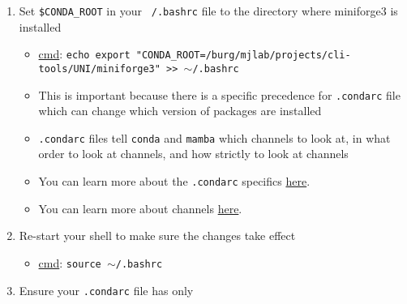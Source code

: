 \documentclass{article}
\newcommand{\UNI}{UNI}
\begin{document}
\begin{enumerate}
        \item Set \texttt{\$CONDA\_ROOT} in your \texttt{~/.bashrc} file to the directory where miniforge3 is installed
        \begin{itemize}
            \item \underline{cmd}: \texttt{echo export "CONDA\_ROOT=/burg/mjlab/projects/cli-tools/\UNI/miniforge3" >> $\sim$/.bashrc}
            \item This is important because there is a specific precedence for \texttt{.condarc} file which can change which version of packages are installed
            \item \texttt{.condarc} files tell \texttt{conda} and \texttt{mamba} which channels to look at, in what order to look at channels, and how strictly to look at channels
            \item You can learn more about the \texttt{.condarc} specifics \href{https://conda.io/projects/conda/en/latest/user-guide/configuration/use-condarc.html}{here}.
            \item You can learn more about channels \href{https://conda.io/projects/conda/en/latest/user-guide/concepts/channels.html}{here}.
        \end{itemize}

        \item Re-start your shell to make sure the changes take effect
        \begin{itemize}
            \item \underline{cmd}: \texttt{source $\sim$/.bashrc}
        \end{itemize}

        \item Ensure your \texttt{.condarc} file has only \texttt{}

    \end{enumerate}
\end{document}

